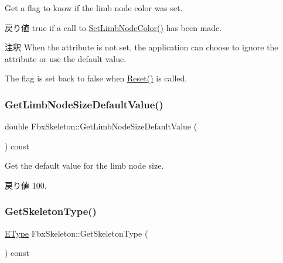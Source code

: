 Get a flag to know if the limb node color was set. \begin{DoxyReturn}{戻り値}
{\ttfamily true} if a call to \hyperlink{class_fbx_skeleton_a19297c7b85e06e47c34e2a97964d7de8}{Set\+Limb\+Node\+Color()} has been made. 
\end{DoxyReturn}
\begin{DoxyRemark}{注釈}
When the attribute is not set, the application can choose to ignore the attribute or use the default value. 

The flag is set back to {\ttfamily false} when \hyperlink{class_fbx_skeleton_a622069fcb67d773d755e96b321df1094}{Reset()} is called. 
\end{DoxyRemark}
\mbox{\label{class_fbx_skeleton_abd7f96a297890ce535821905386b53c9}} 
\subsubsection{\texorpdfstring{Get\+Limb\+Node\+Size\+Default\+Value()}{GetLimbNodeSizeDefaultValue()}}
{\footnotesize\ttfamily double Fbx\+Skeleton\+::\+Get\+Limb\+Node\+Size\+Default\+Value (\begin{DoxyParamCaption}{ }\end{DoxyParamCaption}) const}

Get the default value for the limb node size. \begin{DoxyReturn}{戻り値}
100. 
\end{DoxyReturn}
\mbox{\label{class_fbx_skeleton_ae3c3a66d78d51d4decf90df544b63cf9}} 
\subsubsection{\texorpdfstring{Get\+Skeleton\+Type()}{GetSkeletonType()}}
{\footnotesize\ttfamily \hyperlink{class_fbx_skeleton_ae067f8fec201e5e3572f039e37ee1c6b}{E\+Type} Fbx\+Skeleton\+::\+Get\+Skeleton\+Type (\begin{DoxyParamCaption}{ }\end{DoxyParamCaption}) const}

